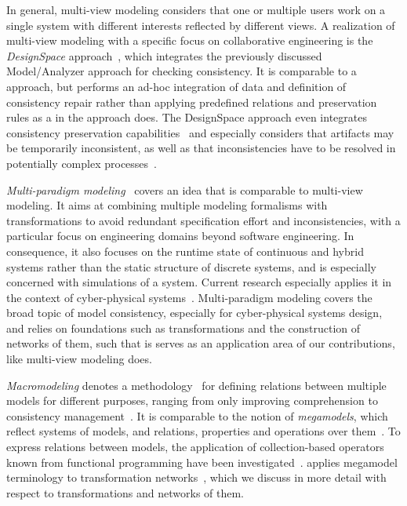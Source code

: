 In general, multi-view modeling considers that one or multiple users work on a single system with different interests reflected by different views.
A realization of multi-view modeling with a specific focus on collaborative engineering is the \emph{DesignSpace} approach~\cite{demuth2015designSpace-SAC,egyed2019consistencyArtifacts-Computer}, which integrates the previously discussed Model/Analyzer approach for checking consistency.
It is comparable to a \vsum approach, but performs an ad-hoc integration of data and definition of consistency repair rather than applying predefined relations and preservation rules as a \vsum in the \vitruv approach does.
The DesignSpace approach even integrates consistency preservation capabilities~\cite{troels2019liveconsistency-SAC, khelladi2019sideeffects-SLE} and especially considers that artifacts may be temporarily inconsistent, as well as that inconsistencies have to be resolved in potentially complex processes~\cite{kretschmer2020ConsistentChangePropagation-SoSym}.

\emph{Multi-paradigm modeling}~\cite{vangheluwe2002mpm-AIS, vangheluwe2003mpm-WSC} covers an idea that is comparable to multi-view modeling.
It aims at combining multiple modeling formalisms with transformations to avoid redundant specification effort and inconsistencies, with a particular focus on engineering domains beyond software engineering.
In consequence, it also focuses on the runtime state of continuous and hybrid systems rather than the static structure of discrete systems, and is especially concerned with simulations of a system.
Current research especially applies it in the context of cyber-physical systems~\cite{carreira2020mpm4cpsfoundations}.
Multi-paradigm modeling covers the broad topic of model consistency, especially for cyber-physical systems design, and relies on foundations such as transformations and the construction of networks of them, such that is serves as an application area of our contributions, like multi-view modeling does.

\emph{Macromodeling} denotes a methodology~\cite{salay2012macromodelingMethodoloy-MODELS} for defining relations between multiple models for different purposes, ranging from only improving comprehension to consistency management~\cite{salay2008macromodeling-ASE,salay2009macromodels-CAiSE}.
It is comparable to the notion of \emph{megamodels}, which reflect systems of models, and relations, properties and operations over them~\cite{diskin2013megamodeling-SLE}.
To express relations between models, the application of collection-based operators known from functional programming have been investigated~\cite{salay2015megamodeling-MODELS, salay2020megamodeling-SoSym}.
 applies megamodel terminology to transformation networks~\cite{stevens2020BuildingFromMegamodels-SoSym}, which we discuss in more detail with respect to transformations and networks of them.

